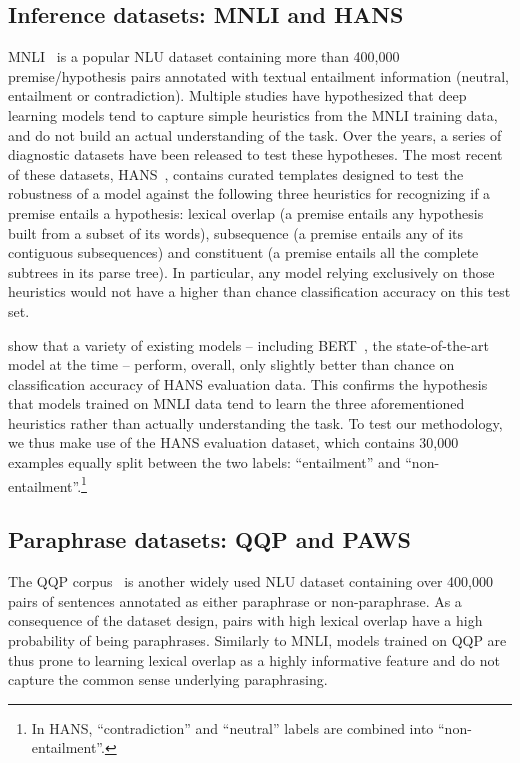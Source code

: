 
\subsection{Inference datasets: MNLI and HANS}
\label{sec:dataset}
MNLI~\citep{williams2017broad} is a popular NLU dataset containing more than 400,000 premise/hypothesis pairs annotated with textual entailment information (neutral, entailment or contradiction). Multiple studies have hypothesized that deep learning models tend to capture simple heuristics from the MNLI training data, and do not build an actual understanding of the task. Over the years, a series of diagnostic datasets have been released to test these hypotheses.
The most recent of these datasets, HANS~\citep[Heuristic Analysis for NLI Systems]{linzen2019right}, contains curated templates designed to test the robustness of a model against the following three heuristics for recognizing if a premise entails a hypothesis: lexical overlap (a premise entails any hypothesis built from a subset of its words), subsequence (a premise entails any of its contiguous subsequences) and constituent (a premise entails all the complete subtrees in its parse tree). In particular, any model relying exclusively on those heuristics would not have a higher than chance classification accuracy on this test set.

\citet{linzen2019right} show that a variety of existing models -- including BERT~\citep{devlin2018bert}, the state-of-the-art model at the time -- perform, overall, only slightly better than chance on classification accuracy of HANS evaluation data. This confirms the hypothesis that models trained on MNLI data tend to learn the three aforementioned heuristics rather than actually understanding the task. To test our methodology, we thus make use of the HANS evaluation dataset, which contains 30,000 examples equally split between the two labels: ``entailment'' and ``non-entailment''.\footnote{In HANS, ``contradiction'' and ``neutral'' labels are combined into ``non-entailment''.}

\subsection{Paraphrase datasets: QQP and PAWS}
\label{sec:dataset_qqp}

The QQP corpus~\citep{qqp} is another widely used NLU dataset containing over 400,000 pairs of sentences annotated as either paraphrase or non-paraphrase. As a consequence of the dataset design, pairs with high lexical overlap have a high probability of being paraphrases. Similarly to MNLI, models trained on QQP are thus prone to learning lexical overlap as a highly informative feature and do not capture the common sense underlying paraphrasing. 

